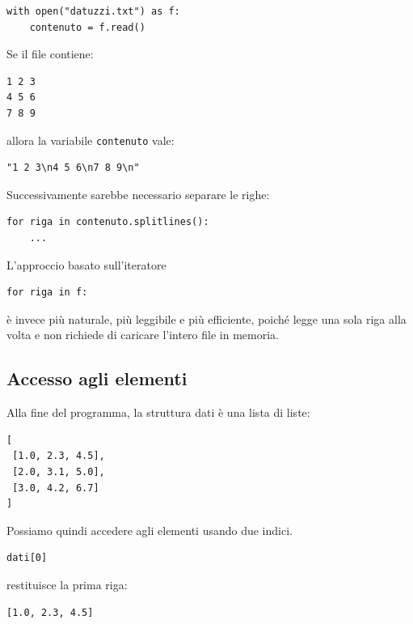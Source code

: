 \documentclass[11pt,a4paper]{book}
\begin{document}
\begin{lstlisting}[style=python]
with open("datuzzi.txt") as f:
    contenuto = f.read()
\end{lstlisting}

Se il file contiene:

\begin{lstlisting}[style=output]
1 2 3
4 5 6
7 8 9
\end{lstlisting}

allora la variabile \texttt{contenuto} vale:

\begin{lstlisting}[style=output]
"1 2 3\n4 5 6\n7 8 9\n"
\end{lstlisting}

Successivamente sarebbe necessario separare le righe:

\begin{lstlisting}[style=python]
for riga in contenuto.splitlines():
    ...
\end{lstlisting}

L'approccio basato sull'iteratore

\begin{lstlisting}[style=python]
for riga in f:
\end{lstlisting}

è invece più naturale, più leggibile e più efficiente, poiché legge una sola riga alla volta e non richiede di caricare l'intero file in memoria.

\subsection{Accesso agli elementi}

Alla fine del programma, la struttura dati è una lista di liste:

\begin{lstlisting}[style=output]
[
 [1.0, 2.3, 4.5],
 [2.0, 3.1, 5.0],
 [3.0, 4.2, 6.7]
]
\end{lstlisting}

Possiamo quindi accedere agli elementi usando due indici.

\begin{lstlisting}[style=python]
dati[0]
\end{lstlisting}

restituisce la prima riga:

\begin{lstlisting}[style=output]
[1.0, 2.3, 4.5]
\end{lstlisting}
\end{document}

